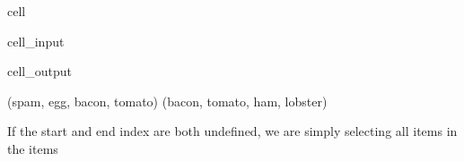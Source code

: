 \documentclass[letterpaper,10pt,english]{jupyterBook}
\begin{document}
\begin{sphinxuseclass}{cell}\begin{sphinxVerbatimInput}

\begin{sphinxuseclass}{cell_input}
\begin{sphinxVerbatim}[commandchars=\\\{\}]
\PYG{p}{[}\PYG{p}{]}
\PYG{p}{[}\PYG{p}{]}
\end{sphinxVerbatim}

\end{sphinxuseclass}\end{sphinxVerbatimInput}
\begin{sphinxVerbatimOutput}

\begin{sphinxuseclass}{cell_output}
\begin{sphinxVerbatim}[commandchars=\\\{\}]
(\PYGZsq{}spam\PYGZsq{}, \PYGZsq{}egg\PYGZsq{}, \PYGZsq{}bacon\PYGZsq{}, \PYGZsq{}tomato\PYGZsq{})
(\PYGZsq{}bacon\PYGZsq{}, \PYGZsq{}tomato\PYGZsq{}, \PYGZsq{}ham\PYGZsq{}, \PYGZsq{}lobster\PYGZsq{})
\end{sphinxVerbatim}

\end{sphinxuseclass}\end{sphinxVerbatimOutput}

\end{sphinxuseclass}
\sphinxAtStartPar
If the start and end index are both undefined, we are simply selecting all items in the items
\end{document}
